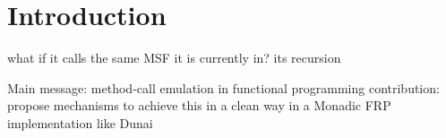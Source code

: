 \section{Introduction}

what if it calls the same MSF it is currently in? its recursion

Main message: method-call emulation in functional programming
contribution: propose mechanisms to achieve this in a clean way in a Monadic FRP implementation like Dunai